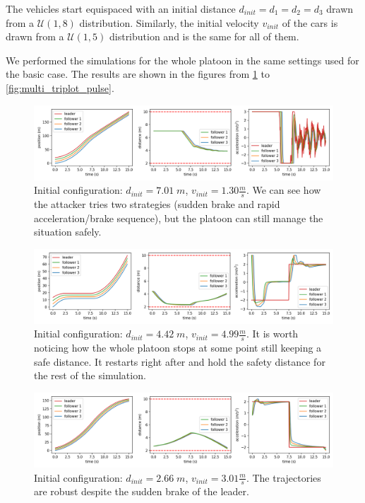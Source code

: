 The vehicles start equispaced with an initial distance $d_{init}= d_1 = d_2 = d_3$ drawn from a $\mathcal{U}(1,8)$ distribution.
Similarly, the initial velocity $v_{init}$ of the cars is drawn from a $\mathcal{U}(1,5)$ distribution and is the same for all of them.

We performed the simulations for the whole platoon in the same settings used for the basic case.
The results are shown in the figures from \ref{fig:multi_triplot_attacker} to \ref{fig:multi_triplot_pulse}.
\begin{figure}[H]
	\centering
	\includegraphics[width=13.8cm, keepaspectratio]{img/5_3_triplot_fullplatooning_attacker.png}
	\caption{Initial configuration: $d_{init}= 7.01\; m$, $v_{init}=1.30 \frac{m}{s}$. We can see how the attacker tries two strategies (sudden brake and rapid acceleration/brake sequence), but the platoon can still manage the situation safely.}
    \label{fig:multi_triplot_attacker}
\end{figure}

\begin{figure}[H]
	\centering
	\includegraphics[width=13.8cm, keepaspectratio]{img/5_3_triplot_fullplatooning_stepup.png}
	\caption{Initial configuration: $d_{init}= 4.42\; m$, $v_{init}=4.99 \frac{m}{s}$. It is worth noticing how the whole platoon stops at some point still keeping a safe distance. It restarts right after and hold the safety distance for the rest of the simulation.}
    \label{fig:multi_triplot_stepup}
\end{figure}

\begin{figure}[H]
	\centering
	\includegraphics[width=13.8cm, keepaspectratio]{img/5_3_triplot_fullplatooning_stepdown.png}
	\caption{Initial configuration: $d_{init}= 2.66\; m$, $v_{init}=3.01 \frac{m}{s}$. The trajectories are robust despite the sudden brake of the leader.}
    \label{fig:multi_triplot_stepdown}
\end{figure}

